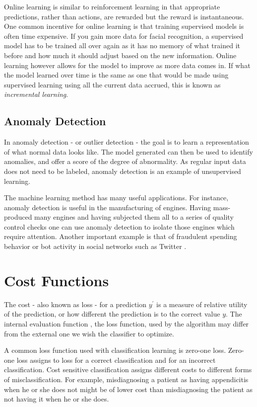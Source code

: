 Online learning is similar to reinforcement learning in that appropriate predictions, rather than actions, are rewarded but the reward is instantaneous.
One common incentive for online learning is that training supervised models is often time expensive.
If you gain more data for facial recognition, a supervised model has to be trained all over again as it has no memory of what trained it before and how much it should adjust based on the new information.
Online learning however allows for the model to improve as more data comes in.
If what the model learned over time is the same as one that would be made using supervised learning using all the current data accrued, this is known as \textit{incremental learning}.

	\subsection{Anomaly Detection}
        
In anomaly detection - or outlier detection - the goal is to learn a representation of what normal data looks like.
The model generated can then be used to identify anomalies, and offer a score of the degree of abnormality\citep{barber2012bayesian}.
As regular input data does not need to be labeled, anomaly detection is an example of unsupervised learning.

The machine learning method has many useful applications.
For instance, anomaly detection is useful in the manufacturing of engines.
Having mass-produced many engines and having subjected them all to a series of quality control checks one can use anomaly detection to isolate those engines which require attention.
Another important example is that of fraudulent spending behavior or bot activity in social networks such as Twitter \citep{wang2010detecting}.

\section{Cost Functions}

The cost - also known as loss - for a prediction $y^\prime$ is a measure of relative utility of the prediction, or how different the prediction is to the correct value $y$.
The internal evaluation function , the loss function, used by the algorithm may differ from the external one we wish the classifier to optimize.

A common loss function used with classification learning is zero-one loss. 
Zero-one loss assigns  to loss for a correct classification and for an incorrect classification. 
Cost sensitive classification assigns different costs to different forms of misclassification. 
For example, misdiagnosing a patient as having appendicitis when he or she does not might be of lower cost than misdiagnosing the patient as not having it when he or she does. 

